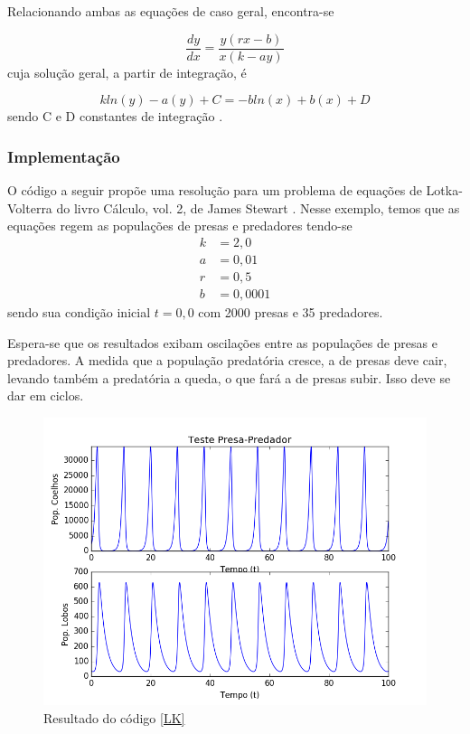         		Relacionando ambas as equações de caso geral, encontra-se
        		
        			\[\frac{dy}{dx} = \frac{y (r x - b)}{x (k - a y)}\]
        		cuja solução geral, a partir de integração, é
        		
        			\[k ln(y) - a(y) + C = -b ln(x) + b(x) + D\]
        		sendo C e D constantes de integração \cite{wiki:eqLotkaVolterra}.
        		
        	\subsubsection{Implementação}
        	
        	    O código a seguir propõe uma resolução para um problema de equações de Lotka-Volterra do livro Cálculo, vol. 2, de James Stewart \cite{stewart}. Nesse exemplo, temos que as equações regem as populações de presas e predadores tendo-se
        	    \begin{align*}
        	        k &= 2,0\\
        	        a &= 0,01\\
        	        r &= 0,5\\
        	        b &= 0,0001
        	    \end{align*}
        	    sendo sua condição inicial $t = 0,0$ com 2000 presas e 35 predadores.
        	    
        	    Espera-se que os resultados exibam oscilações entre as populações de presas e predadores. A medida que a população predatória cresce, a de presas deve cair, levando também a predatória a queda, o que fará a de presas subir. Isso deve se dar em ciclos.
        	    
        	    
        	    
        	    \begin{figure}[H]
        	        \centering \includegraphics[scale=.8]{resultsCodigos/testePresaPredador.png}
        	        \caption{Resultado do código \ref{LK}}
        	        \label{fig:testPresaPredador}
        	    \end{figure}
        	    
